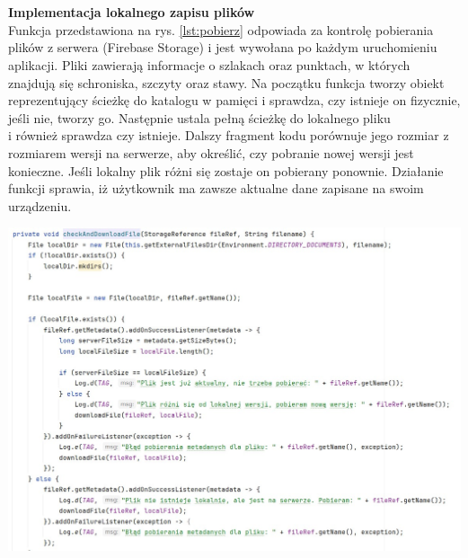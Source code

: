 \noindent
\begin{minipage}{\linewidth}
    \label{lst:rysowanie}
    \centering
\end{minipage}\\

\\
\noindent \textbf{Implementacja lokalnego zapisu plików} \\ 
\indent Funkcja przedstawiona na rys. \ref{lst:pobierz} odpowiada za kontrolę pobierania plików z serwera (Firebase Storage) i jest wywołana po każdym uruchomieniu aplikacji. Pliki zawierają informacje o szlakach oraz punktach, w których znajdują się schroniska, szczyty oraz stawy. Na początku funkcja tworzy obiekt reprezentujący ścieżkę do katalogu w pamięci i sprawdza, czy istnieje on fizycznie, jeśli nie, tworzy go. Następnie ustala pełną ścieżkę do lokalnego pliku \\i również sprawdza czy istnieje. Dalszy fragment kodu porównuje jego rozmiar z rozmiarem wersji na serwerze, aby określić, czy pobranie nowej wersji jest konieczne. Jeśli lokalny plik różni się zostaje on pobierany ponownie. Działanie funkcji sprawia, iż użytkownik ma zawsze aktualne dane zapisane na swoim urządzeniu. 
\\

\noindent
\begin{minipage}{\linewidth}
    \label{lst:pobierz}
    \centering
    \includegraphics[width=0.6\linewidth]{img/kod/imp-ckeckandadd.jpg}
\end{minipage}\\

